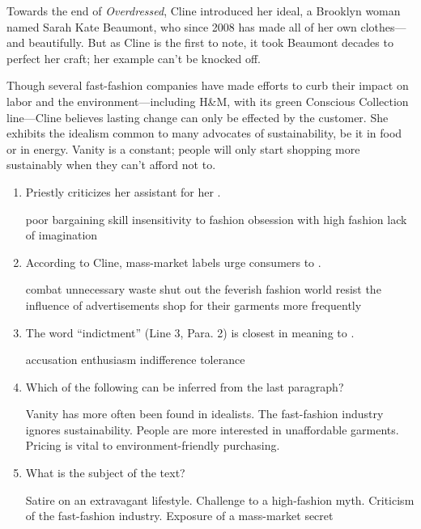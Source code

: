 Towards the end of \emph{Overdressed}, Cline introduced her ideal, a
Brooklyn woman named Sarah Kate Beaumont, who since 2008 has made all of
her own clothes---and beautifully. But as Cline is the first to note, it
took Beaumont decades to perfect her craft; her example can't be knocked
off.

Though several fast-fashion companies have made efforts to curb their
impact on labor and the environment---including H\&M, with its green
Conscious Collection line---Cline believes lasting change can only be
effected by the customer. She exhibits the idealism common to many
advocates of sustainability, be it in food or in energy. Vanity is a
constant; people will only start shopping more sustainably when they
can't afford not to.



\begin{enumerate}[resume]
	\item
Priestly criticizes her assistant for her \lineread.


\fourchoices
{poor bargaining skill}
{insensitivity to fashion}
{obsession with high fashion}
{lack of imagination}


\item
According to Cline, mass-market labels urge consumers to \lineread.


\fourchoices
{combat unnecessary waste}
{shut out the feverish fashion world}
{resist the influence of advertisements}
{shop for their garments more frequently}





\item
The word ``indictment'' (Line 3, Para. 2) is closest in
meaning to \lineread.


\fourchoices
{accusation}
{enthusiasm}
{indifference}
{tolerance}


\item
Which of the following can be inferred from the last
paragraph?


\fourchoices
{Vanity has more often been found in idealists.}
{The fast-fashion industry ignores sustainability.}
{People are more interested in unaffordable garments.}
{Pricing is vital to environment-friendly purchasing.}



\item
What is the subject of the text?


\fourchoices
{Satire on an extravagant lifestyle.}
{Challenge to a high-fashion myth.}
{Criticism of the fast-fashion industry.}
{Exposure of a mass-market secret}

\end{enumerate}

